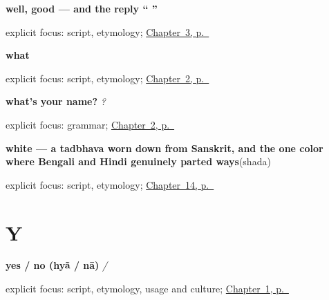 \noindent\begin{minipage}[t]{\linewidth}
\raggedright
\textbf{well, good — and the reply \textquotedblleft{}  \textquotedblright{}}\enspace\emph{}\par
\footnotesize explicit focus: script, etymology; \hyperref[ch:responding]{Chapter~3, p.~\pageref*{ch:responding}}
\end{minipage}\par\smallskip

\noindent\begin{minipage}[t]{\linewidth}
\raggedright
\textbf{what}\enspace\emph{}\par
\footnotesize explicit focus: script, etymology; \hyperref[ch:introductions]{Chapter~2, p.~\pageref*{ch:introductions}}
\end{minipage}\par\smallskip

\noindent\begin{minipage}[t]{\linewidth}
\raggedright
\textbf{what's your name?}\enspace\emph{  ?}\par
\footnotesize explicit focus: grammar; \hyperref[ch:introductions]{Chapter~2, p.~\pageref*{ch:introductions}}
\end{minipage}\par\smallskip

\noindent\begin{minipage}[t]{\linewidth}
\raggedright
\textbf{white — a tadbhava worn down from Sanskrit, and the one color where Bengali and Hindi genuinely parted ways}\enspace\emph{}\enspace(shada)\par
\footnotesize explicit focus: script, etymology; \hyperref[ch:bn-five-colors]{Chapter~14, p.~\pageref*{ch:bn-five-colors}}
\end{minipage}\par\smallskip

\section*{Y}

\noindent\begin{minipage}[t]{\linewidth}
\raggedright
\textbf{yes / no (hyã / nā)}\enspace\emph{ / }\par
\footnotesize explicit focus: script, etymology, usage and culture; \hyperref[ch:greetings]{Chapter~1, p.~\pageref*{ch:greetings}}
\end{minipage}\par\smallskip

